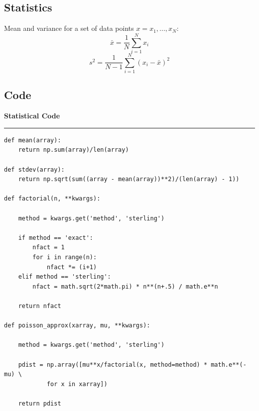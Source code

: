 \documentclass[preprint]{aastex62}
\begin{document}
\subsection{Statistics}
Mean and variance for a set of data points $x={x_1, ...,x_N}$:
\begin{equation}
	\bar{x} = \frac{1}{N} \sum^N_{i=1} x_i  
\end{equation}
\begin{equation}
	s^2 = \frac{1}{N-1} \sum^N_{i=1} (x_i - \bar{x})^2
\end{equation}

\subsection{Code}

\small
\textbf{Statistical Code} \label{code:stats} \\
\hrule
\begin{lstlisting}
def mean(array):
    return np.sum(array)/len(array)

def stdev(array):
    return np.sqrt(sum((array - mean(array))**2)/(len(array) - 1))

def factorial(n, **kwargs):
    
    method = kwargs.get('method', 'sterling')
    
    if method == 'exact':
        nfact = 1
        for i in range(n):
            nfact *= (i+1)
    elif method == 'sterling': 
        nfact = math.sqrt(2*math.pi) * n**(n+.5) / math.e**n
        
    return nfact

def poisson_approx(xarray, mu, **kwargs):
    
    method = kwargs.get('method', 'sterling')
    
    pdist = np.array([mu**x/factorial(x, method=method) * math.e**(-mu) \
    		for x in xarray])
    
    return pdist
\end{lstlisting}
\end{document}
